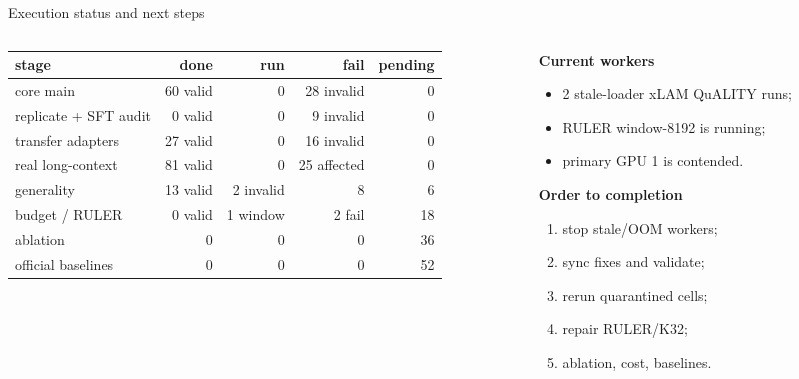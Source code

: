 \begin{frame}{Execution status and next steps}
  \begin{columns}[T]
  \begin{column}{0.56\textwidth}
    \centering\scriptsize
    \begin{tabular}{lrrrr}
    \toprule
    stage & done & run & fail & pending \\
    \midrule
    core main & 60 valid & 0 & 28 invalid & 0 \\
    replicate + SFT audit & 0 valid & 0 & 9 invalid & 0 \\
    transfer adapters & 27 valid & 0 & 16 invalid & 0 \\
    real long-context & 81 valid & 0 & 25 affected & 0 \\
    generality & 13 valid & 2 invalid & 8 & 6 \\
    budget / RULER & 0 valid & 1 window & 2 fail & 18 \\
    ablation & 0 & 0 & 0 & 36 \\
    official baselines & 0 & 0 & 0 & 52 \\
    \bottomrule
    \end{tabular}
  \end{column}
  \begin{column}{0.44\textwidth}
    \textbf{Current workers}
    \begin{itemize}\scriptsize
      \item 2 stale-loader xLAM QuALITY runs;
      \item RULER window-8192 is running;
      \item primary GPU 1 is contended.
    \end{itemize}
    \textbf{Order to completion}
    \begin{enumerate}\scriptsize
      \item stop stale/OOM workers;
      \item sync fixes and validate;
      \item rerun quarantined cells;
      \item repair RULER/K32;
      \item ablation, cost, baselines.
    \end{enumerate}
  \end{column}
  \end{columns}
\end{frame}
